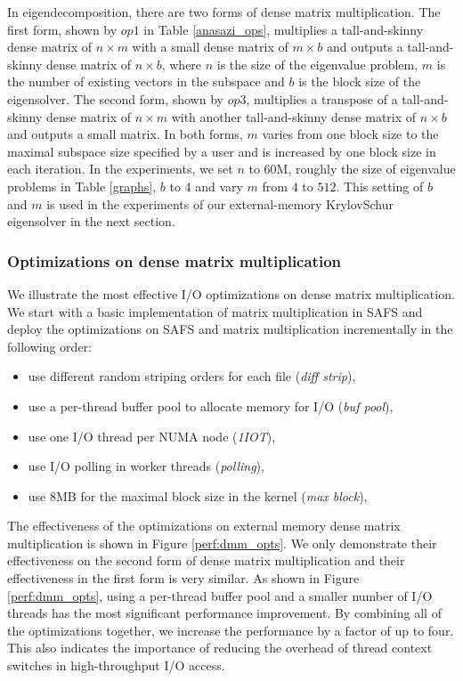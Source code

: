 In eigendecomposition, there are two forms of dense matrix multiplication.
The first form, shown by $op1$ in Table \ref{anasazi_ops}, multiplies
a tall-and-skinny dense matrix of $n \times m$
with a small dense matrix of $m \times b$ and outputs a tall-and-skinny dense
matrix of $n \times b$, where $n$ is the size of the eigenvalue problem,
$m$ is the number of existing vectors in the subspace and $b$ is the block
size of the eigensolver. The second form, shown by $op3$, multiplies
a transpose of a tall-and-skinny dense matrix of $n \times m$ with another
tall-and-skinny dense matrix of $n \times b$ and outputs a small matrix.
In both forms, $m$ varies from one block size to the maximal subspace size
specified by a user and is increased by one block size in each
iteration. In the experiments, we set $n$ to 60M, roughly the size of
eigenvalue problems in Table \ref{graphs}, $b$ to 4 and vary $m$
from $4$ to $512$. This setting of $b$ and $m$ is used in the experiments
of our external-memory KrylovSchur eigensolver in the next section.

\subsubsection{Optimizations on dense matrix multiplication}

We illustrate the most effective I/O optimizations on dense matrix
multiplication. We start with a basic implementation of matrix multiplication
in SAFS and deploy the optimizations on SAFS and matrix multiplication
incrementally in the following order:
\begin{itemize} \itemsep1pt \parskip0pt 
	\item use different random striping orders for each file (\textit{diff strip}),
	\item use a per-thread buffer pool to allocate memory for I/O (\textit{buf pool}),
	\item use one I/O thread per NUMA node (\textit{1IOT}),
	\item use I/O polling in worker threads (\textit{polling}),
	\item use 8MB for the maximal block size in the kernel (\textit{max block}),
\end{itemize}

The effectiveness of the optimizations on external memory dense matrix
multiplication is shown in Figure \ref{perf:dmm_opts}. We only demonstrate
their effectiveness on the second form of dense matrix multiplication and
their effectiveness in the first form is very similar. As shown in Figure
\ref{perf:dmm_opts}, using a per-thread buffer pool and a smaller number
of I/O threads has the most significant performance improvement. By combining
all of the optimizations together, we increase the performance by a factor
of up to four. This also indicates the importance of reducing the overhead
of thread context switches in high-throughput I/O access.

